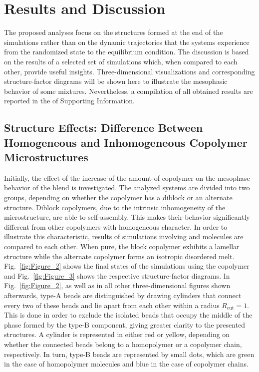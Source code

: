 \documentclass[
aip,
jcp,
reprint,
]{revtex4-1}
\begin{document}
\section{Results and Discussion}
\label{sec:results and discussion}


The proposed analyses focus on the structures formed at the end of the simulations rather than on the dynamic trajectories that the systems experience from the randomized state to the equilibrium condition.
The discussion is based on the results of a selected set of simulations which, when compared to each other, provide useful insights.
Three-dimensional visualizations and corresponding structure-factor diagrams will be shown here to illustrate the mesophasic behavior of some mixtures.
Nevertheless, a compilation of all obtained results are reported in the of Supporting Information.

\subsection{Structure Effects: Difference Between Homogeneous and Inhomogeneous Copolymer Microstructures}

Initially, the effect of the increase of the amount of copolymer on the mesophase behavior of the blend is investigated.
The analyzed systems are divided into two groups, depending on whether the copolymer has a diblock or an alternate structure.
Diblock copolymers, due to the intrinsic inhomogeneity of the microstructure, are able to self-assembly.
This makes their behavior significantly different from other copolymers with homogeneous character.
In order to illustrate this characteristic, results of simulations involving  and  molecules are compared to each other.
When pure, the block copolymer exhibits a lamellar structure while the alternate copolymer forms an isotropic disordered melt.
Fig.~\ref{fig:Figure_2} shows the final states of the simulations using the  copolymer and Fig.~\ref{fig:Figure_3} shows the respective structure-factor diagrams.
In Fig.~\ref{fig:Figure_2}, as well as in all other three-dimensional figures shown afterwards, type-A beads are distinguished by drawing cylinders that connect every two of these beads and lie apart from each other within a radius $R_\mathrm{cut}=1$.
This is done in order to exclude the isolated beads that occupy the middle of the phase formed by the type-B component, giving greater clarity to the presented structures.
A cylinder is represented in either red or yellow, depending on whether the connected beads belong to a homopolymer or a copolymer chain, respectively.
In turn, type-B beads are represented by small dots, which are green in the case of homopolymer molecules and blue in the case of copolymer chains.
\end{document}

